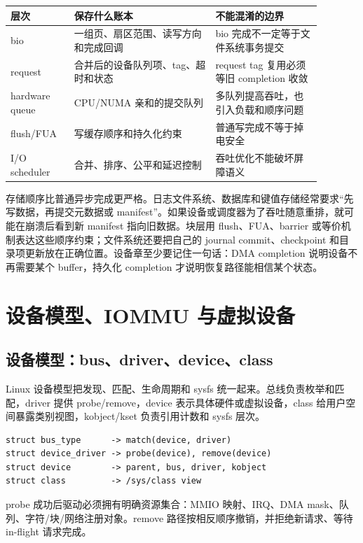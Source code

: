 \begin{longtable}{|p{0.18\linewidth}|p{0.40\linewidth}|p{0.30\linewidth}|}
\toprule
层次 & 保存什么账本 & 不能混淆的边界 \\
\midrule
bio & 一组页、扇区范围、读写方向和完成回调 & bio 完成不一定等于文件系统事务提交 \\\tablerowrule
request & 合并后的设备队列项、tag、超时和状态 & request tag 复用必须等旧 completion 收敛 \\\tablerowrule
hardware queue & CPU/NUMA 亲和的提交队列 & 多队列提高吞吐，也引入负载和顺序问题 \\\tablerowrule
flush/FUA & 写缓存顺序和持久化约束 & 普通写完成不等于掉电安全 \\\tablerowrule
I/O scheduler & 合并、排序、公平和延迟控制 & 吞吐优化不能破坏屏障语义 \\
\bottomrule
\end{longtable}

存储顺序比普通异步完成更严格。日志文件系统、数据库和键值存储经常要求“先写数据，再提交元数据或 manifest”。如果设备或调度器为了吞吐随意重排，就可能在崩溃后看到新 manifest 指向旧数据。块层用 flush、FUA、barrier 或等价机制表达这些顺序约束；文件系统还要把自己的 journal commit、checkpoint 和目录项更新放在正确位置。设备章至少要记住一句话：DMA completion 说明设备不再需要某个 buffer，持久化 completion 才说明恢复路径能相信某个状态。

\section{设备模型、IOMMU 与虚拟设备}

\subsection{设备模型：bus、driver、device、class}

Linux 设备模型把发现、匹配、生命周期和 sysfs 统一起来。总线负责枚举和匹配，driver 提供 probe/remove，device 表示具体硬件或虚拟设备，class 给用户空间暴露类别视图，kobject/kset 负责引用计数和 sysfs 层次。

\begin{lstlisting}
struct bus_type      -> match(device, driver)
struct device_driver -> probe(device), remove(device)
struct device        -> parent, bus, driver, kobject
struct class         -> /sys/class view
\end{lstlisting}

probe 成功后驱动必须拥有明确资源集合：MMIO 映射、IRQ、DMA mask、队列、字符/块/网络注册对象。remove 路径按相反顺序撤销，并拒绝新请求、等待 in-flight 请求完成。

